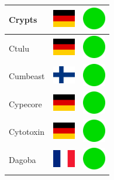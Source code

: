 \documentclass[12pt, a4paper, twoside]{report}
\begin{document}
\begin{center}
\begin{longtable}{|p{5cm}|p{2cm}|p{2cm}|}
 Crypts                                                     & \includegraphics[width=1cm]{../4x3/de} &   \includegraphics[width=1cm]{../likes/y} \\ \hline
 Ctulu                                                      & \includegraphics[width=1cm]{../4x3/de} &   \includegraphics[width=1cm]{../likes/y} \\ \hline
 Cumbeast                                                   & \includegraphics[width=1cm]{../4x3/fi} &   \includegraphics[width=1cm]{../likes/y} \\ \hline
 Cypecore                                                   & \includegraphics[width=1cm]{../4x3/de} &   \includegraphics[width=1cm]{../likes/y} \\ \hline
 Cytotoxin                                                  & \includegraphics[width=1cm]{../4x3/de} &   \includegraphics[width=1cm]{../likes/y} \\ \hline
 Dagoba                                                     & \includegraphics[width=1cm]{../4x3/fr} &   \includegraphics[width=1cm]{../likes/y} \\ \hline

\end{longtable}
\end{center}
\end{document}
